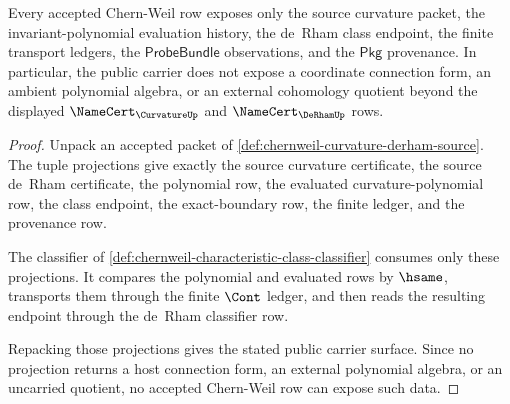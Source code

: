 \begin{theorem}
\label{thm:chernweil-invariant-polynomial-carrier-obligation}
Every accepted Chern-Weil row exposes only the source curvature packet, the invariant-polynomial evaluation history, the de~Rham class endpoint, the finite transport ledgers, the $\mathsf{ProbeBundle}$ observations, and the $\mathsf{Pkg}$ provenance. In particular, the public carrier does not expose a coordinate connection form, an ambient polynomial algebra, or an external cohomology quotient beyond the displayed $\NameCert_{\CurvatureUp}$ and $\NameCert_{\DeRhamUp}$ rows.
\end{theorem}
\begin{proof}
Unpack an accepted packet of \autoref{def:chernweil-curvature-derham-source}. The tuple projections give exactly the source curvature certificate, the source de~Rham certificate, the polynomial row, the evaluated curvature-polynomial row, the class endpoint, the exact-boundary row, the finite ledger, and the provenance row.

The classifier of \autoref{def:chernweil-characteristic-class-classifier} consumes only these projections. It compares the polynomial and evaluated rows by $\hsame$, transports them through the finite $\Cont$ ledger, and then reads the resulting endpoint through the de~Rham classifier row.

Repacking those projections gives the stated public carrier surface. Since no projection returns a host connection form, an external polynomial algebra, or an uncarried quotient, no accepted Chern-Weil row can expose such data.
\end{proof}

